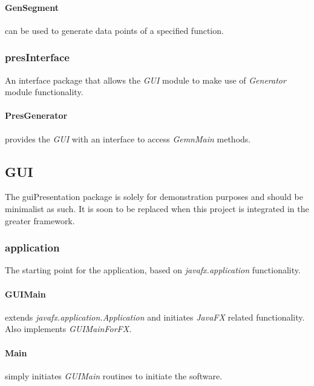 \documentclass[main.tex]{subfiles}
\begin{document}
        \paragraph{GenSegment} can be used to generate data points of a specified function.
      
      \subsubsection*{presInterface}
        
        An interface package that allows the \textit{GUI} module to make use of \textit{Generator} module functionality.
        
        \paragraph{PresGenerator} provides the \textit{GUI} with an interface to access \textit{GemnMain} methods.
      
    \subsection{GUI}
      
      The guiPresentation package is solely for demonstration purposes and should be minimalist as such. It is soon to be replaced when this project is integrated in the greater framework.
      
      \subsubsection*{application}
        
        The starting point for the application, based on \textit{javafx.application} functionality.
        
        \paragraph{GUIMain} extends \textit{javafx.application.Application} and initiates \textit{JavaFX} related functionality.\\
        Also implements \textit{GUIMainForFX}.
        
        \paragraph{Main} simply initiates \textit{GUIMain} routines to initiate the software.
      
\end{document}
